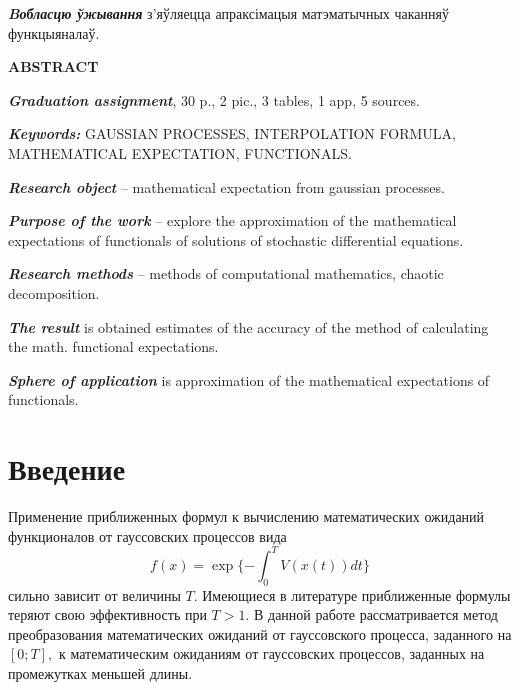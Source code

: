 \documentclass [a4paper, 12pt]{report}
\begin{document}
\emph{\textbf{Bобласцю ўжывання}} з'яўляецца апраксімацыя матэматычных чаканняў функцыяналаў.

\begin{center}
	\textbf{ABSTRACT}
\end{center}

\emph{\textbf{Graduation assignment}}, 30 p., 2 pic., 3 tables, 1 app, 5 sources.

\emph{\textbf{Keywords:}} GAUSSIAN PROCESSES, INTERPOLATION FORMULA,\\ MATHEMATICAL EXPECTATION, FUNCTIONALS.

\emph{\textbf{Research object}} -- mathematical expectation from gaussian processes.

\emph{\textbf{Purpose of the work}} -- explore the approximation of the mathematical expectations of functionals of solutions of stochastic differential equations.

\emph{\textbf{Research methods}} -- methods of computational mathematics, chaotic decomposition.

\emph{\textbf{The result}} is obtained estimates of the accuracy of the method of calculating the math. functional expectations.

\emph{\textbf{Sphere of application }}is approximation of the mathematical expectations of functionals.

\renewcommand\contentsname{Содержание}
\tableofcontents{}

\newpage

\chapter*{Введение}

Применение приближенных формул к вычислению математических ожиданий
функционалов от гауссовских процессов вида
$$
f(x) = \exp\{-\int_{0}^{T}V(x(t))dt\}
$$
сильно зависит от величины $T. $ Имеющиеся в литературе приближенные формулы
теряют свою эффективность при $T > 1.$
В данной работе рассматривается метод преобразования
математических ожиданий от гауссовского процесса, заданного на $[0;T],$
к математическим ожиданиям от гауссовских процессов, заданных на
промежутках меньшей длины.
\end{document}
